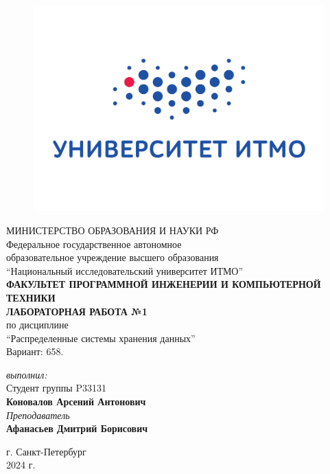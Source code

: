 \begin{center}

	\begin{figure}[H]
	\centering
	\includegraphics[scale=0.37]{img/logo.jpg}
	\end{figure}
	\hfill \break
	МИНИСТЕРСТВО ОБРАЗОВАНИЯ И НАУКИ РФ\\
	\hfill \break
	Федеральное государственное автономное\\
	образовательное учреждение высшего образования\\
	``Национальный исследовательский университет ИТМО''\\
	\hfill \break
	\textbf{ФАКУЛЬТЕТ ПРОГРАММНОЙ ИНЖЕНЕРИИ И КОМПЬЮТЕРНОЙ ТЕХНИКИ}\\
	\vspace{2cm}
	\large{\textbf{ЛАБОРАТОРНАЯ РАБОТА №1}}\\
	\hfill \break
	по дисциплине\\
	\large{``Распределенные системы хранения данных''}\\
	\hfill \break
	Вариант: 658.
	\vspace{3cm}
	\begin{flushright}
	\textit{выполнил:}\\
	Студент группы P33131\\
	\textbf{Коновалов Арсений Антонович}\\
	\textit{Преподаватель}\\
	\textbf{Афанасьев Дмитрий Борисович}
	\end{flushright}
\end{center}

\vfill

\begin{center} г. Санкт-Петербург\\2024 г.
\end{center}

\thispagestyle{empty}
\newpage
